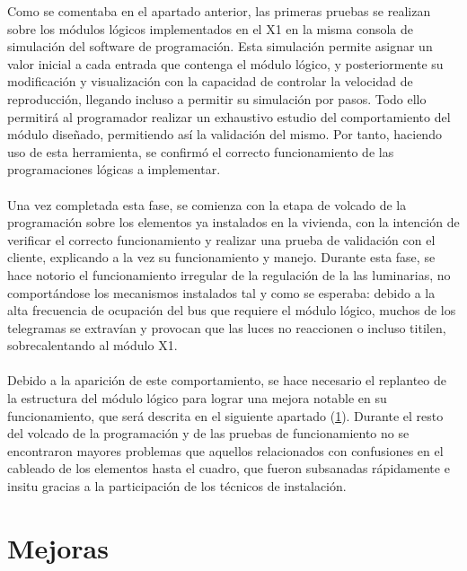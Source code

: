 Como se comentaba en el apartado anterior, las primeras pruebas se realizan sobre los módulos lógicos implementados en el X1 en la misma consola de simulación del software de programación. Esta simulación permite asignar un valor inicial a cada entrada que contenga el módulo lógico, y posteriormente su modificación y visualización con la capacidad de controlar la velocidad de reproducción, llegando incluso a permitir su simulación por pasos. Todo ello permitirá al programador realizar un exhaustivo estudio del comportamiento del módulo diseñado, permitiendo así la validación del mismo. Por tanto, haciendo uso de esta herramienta, se confirmó el correcto funcionamiento de las programaciones lógicas a implementar.\\\\
Una vez completada esta fase, se comienza con la etapa de volcado de la programación sobre los elementos ya instalados en la vivienda, con la intención de verificar el correcto funcionamiento y realizar una prueba de validación con el cliente, explicando a la vez su funcionamiento y manejo. Durante esta fase, se hace notorio el funcionamiento irregular de la regulación de la las luminarias, no comportándose los mecanismos instalados tal y como se esperaba: debido a la alta frecuencia de ocupación del bus que requiere el módulo lógico, muchos de los telegramas se extravían y provocan que las luces no reaccionen o incluso titilen, sobrecalentando al módulo X1. \\\\
Debido a la aparición de este comportamiento, se hace necesario el replanteo de la estructura del módulo lógico para lograr una mejora notable en su funcionamiento, que será descrita en el siguiente apartado (\ref{sec:mejoras}). Durante el resto del volcado de la programación y de las pruebas de funcionamiento no se encontraron mayores problemas que aquellos relacionados con confusiones en el cableado de los elementos hasta el cuadro, que fueron subsanadas rápidamente e insitu gracias a la participación de los técnicos de instalación.

\vspace{2cm}

\section{Mejoras}
\label{sec:mejoras}

